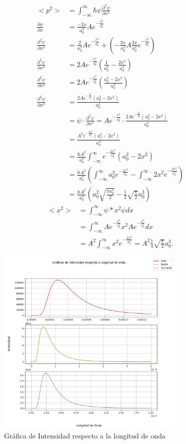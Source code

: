 \documentclass{report}
\begin{document}
\begin{align*}
  <p^2> &= \int_{-\infty}^{\infty} \hbar \psi \frac{\partial^2 \psi}{\partial x^2}\\
  \frac{\partial \psi}{\partial x} &= \frac{-2x}{a_0^2}Ae^{-\frac{x^2}{a_0^2}}\\
  \frac{\partial^2 \psi}{\partial x^2} &= \frac{2}{a_0^2}A e^{- \frac{x^2}{a_0^2}} + \left(- \frac{2x}{a_0^2}A \frac{2x}{a_0^2}e^{-\frac{x^2}{a_0^2}}\right)\\
  \frac{\partial^2 \psi}{\partial x^2} &= 2A e^{-\frac{x^2}{a_0^2}}\left( \frac{1}{a_0^2} - \frac{2 x^2}{a_{0}^{4}} \right) \\
  \frac{\partial^2 \psi}{\partial x^2} &= 2A e^{-\frac{x^2}{a_0^2}}\left( \frac{a_0^2 - 2 x^2}{a_{0}^{4}} \right) \\
  \frac{\partial^2 \psi}{\partial x^2} &= \frac{2Ae^{-\frac{x^2}{a_0^2}}(a_0^2-2x^2)}{a_0^4}\\
	&= \psi \cdot \frac{\partial^2 \psi}{\partial x^2} = Ae^{-\frac{x^2}{a_0^2}}\cdot \frac{2Ae^{-\frac{x^2}{a_0^2}}(a_0^2-2x^2)}{a_0^4}\\
	&= \frac{A^2e^{-\frac{2x^2}{a_0^2}}(a_o^2-2x^2)}{a_0^4}\\
	&=\frac{\hbar A^2}{a_0^4} \int_{-\infty}^{\infty}e^{-\frac{2x^2}{a_0^2}}(a_0^2 -2x^2)\\
	&=\frac{\hbar A^2}{a_0^4} \left(\int_{-\infty}^{\infty}a_0^2e^{-\frac{2x^2}{a_0}} - \int_{-\infty}^{\infty}2x^2e^{-\frac{2x^2}{a_0^2}}\right)\\
	&=\frac{\hbar A^2}{a_0^4} \left(a_0^2\sqrt{\frac{\pi a_0^2}{2}}-\frac{1}{2}\sqrt{\frac{\pi}{2}}a_0^3\right)
\end{align*}
\begin{align*}
  <x^2> &= \int_{-\infty}^{\infty}\psi*x^2\psi dx\\
	&=\int_{-\infty}^{\infty} Ae^{-\frac{x^2}{a_0^2}}x^2 Ae^{-\frac{x^2}{a_0^2}}dx\\
	&=A^2\int_{-\infty}^{\infty} x^2 e^{-\frac{2x^2}{a_0^2}}=A^2\frac{1}{4}\sqrt{\frac{\pi}{2}}a_0^3
.\end{align*}

\begin{figure}[h]
  \centering
  \includegraphics[width=0.8\textwidth]{img/General.png}
  \caption{Gráfica de Intensidad respecto a la longitud de onda}
  \label{fig:lng}
\end{figure}
\end{document}
